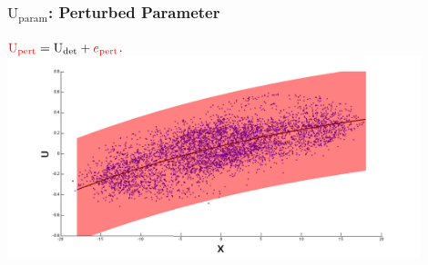 \documentclass[graphics]{beamer}
\begin{document}
\begin{frame}
   \frametitle{$\text{U}_{\text{param}}$: Perturbed Parameter} 
   \vspace{20pt}
   $  {\color{red} \text{U}_{\text{pert}} } = {\color{black} \text{U}_{\text{det}}} + {\color{red} e_{\text{pert}} } $. \\
   \includegraphics[width=0.9\textwidth, height=0.55\textwidth]{stoch_cloud_finalcurve_pert_swath} 
\end{frame}
\end{document}
